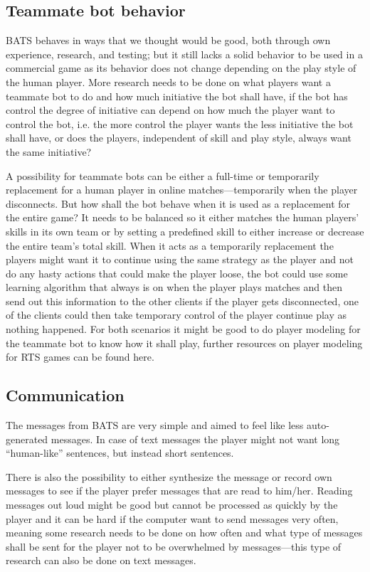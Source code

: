\subsection{Teammate bot behavior}
BATS behaves in ways that we thought would be good, both through own experience, research, and testing; but it still lacks a solid behavior to be used in a commercial game as its behavior does not change depending on the play style of the human player. More research needs to be done on what players want a teammate bot to do and how much initiative the bot shall have, if the bot has control the degree of initiative can depend on how much the player want to control the bot, i.e. the more control the player wants the less initiative the bot shall have, or does the players, independent of skill and play style, always want the same initiative?

A possibility for teammate bots can be either a full-time or temporarily replacement for a human player in online matches—temporarily when the player disconnects. But how shall the bot behave when it is used as a replacement for the entire game? It needs to be balanced so it either matches the human players' skills in its own team or by setting a predefined skill to either increase or decrease the entire team's total skill.
When it acts as a temporarily replacement the players might want it to continue using the same strategy as the player and not do any hasty actions that could make the player loose, the bot could use some learning algorithm that always is on when the player plays matches and then send out this information to the other clients if the player gets disconnected, one of the clients could then take temporary control of the player continue play as nothing happened.
For both scenarios it might be good to do player modeling for the teammate bot to know how it shall play, further resources on player modeling for RTS games can be found here\cite{bakkes09, jansen07, kabanza10, schadd07, synnaeve11}.

\subsection{Communication}
The messages from BATS are very simple and aimed to feel like less auto-generated messages. In case of text messages the player might not want long ``human-like'' sentences, but instead short sentences.

There is also the possibility to either synthesize the message or record own messages to see if the player prefer messages that are read to him/her.
Reading messages out loud might be good but cannot be processed as quickly by the player and it can be hard if the computer want to send messages very often, meaning some research needs to be done on how often and what type of messages shall be sent for the player not to be overwhelmed by messages—this type of research can also be done on text messages.

